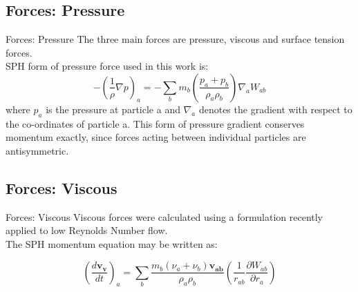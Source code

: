 \documentclass{beamer}
\begin{document}
\subsection{Forces: Pressure}
\begin{frame}{Forces: Pressure}
\justifying
The three main forces are pressure, viscous and surface tension forces. \\
\noindent
SPH form of pressure force used in this work is:
\begin{equation*}
 -\left( \frac{1}{\rho} \nabla p\right)_a = -\sum_b m_b \left( \frac{p_a + p_b}{\rho_a \rho_b}\right) \nabla_a W_{ab}
\end{equation*}
\noindent
where $p_a$ is the pressure at particle a and $\nabla_a$ denotes the gradient with respect to the co-ordinates of particle a. 
This form of pressure gradient conserves momentum exactly, since forces acting between individual particles are antisymmetric.
\end{frame}

\subsection{Forces: Viscous}
\begin{frame}{Forces: Viscous}
\justifying
Viscous forces were calculated using a formulation recently applied to low Reynolds Number flow. \\
The SPH momentum equation may be written as:

\begin{equation*}
 \left(\frac{d\mathbf{v_v}}{dt} \right)_a = \sum_b \frac{m_b(\nu_a + \nu_b)\mathbf{v_{ab}}}{\rho_a\rho_b} \left(\frac{1}{r_{ab}} \frac{\partial W_{ab}}{\partial r_a}\right) 
\end{equation*}
\end{frame}
\end{document}
